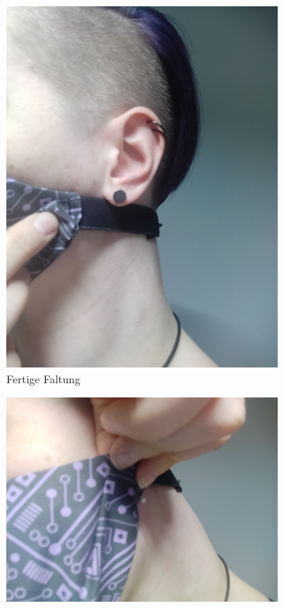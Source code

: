 \documentclass[12pt,parskip=full]{scrartcl}
\begin{document}
\begin{figure}[hp]
\begin{subfigure}{0.48\textwidth}
        \includegraphics[width = \linewidth]{Pictures/11_Folding/Folding3_resized.jpg}
        \caption{Fertige Faltung}
        \label{Folding3}
    \end{subfigure}
    \begin{subfigure}{0.48\textwidth}
        \centering
        \includegraphics[width = \linewidth]{Pictures/11_Folding/Folding4_resized.jpg}

\end{subfigure}
\end{figure}
\end{document}
